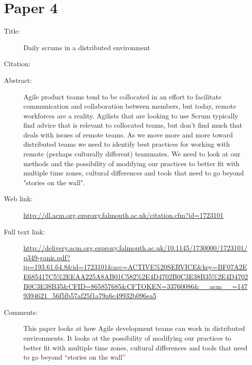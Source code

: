 \documentclass{scrartcl}
\begin{document}
\section*{Paper 4}
\begin{description}
\item[Title:] Daily scrums in a distributed environment
\item[Citation:] \cite{Distributed}
\item[Abstract:] Agile product teams tend to be collocated in an effort to facilitate communication and collaboration between members, but today, remote workforces are a reality. Agilists that are looking to use Scrum typically find advice that is relevant to collocated teams, but don't find much that deals with issues of remote teams. As we move more and more toward distributed teams we need to identify best practices for working with remote (perhaps culturally different) teammates. We need to look at our methods and the possibility of modifying our practices to better fit with multiple time zones, cultural differences and tools that need to go beyond "stories on the wall".
\item[Web link:] \url{http://dl.acm.org.ezproxy.falmouth.ac.uk/citation.cfm?id=1723101}
\item[Full text link:] \url{http://delivery.acm.org.ezproxy.falmouth.ac.uk/10.1145/1730000/1723101/p349-ganis.pdf?ip=193.61.64.8&id=1723101&acc=ACTIVE%20SERVICE&key=BF07A2EE685417C5%2EEAA225A8AB01C582%2E4D4702B0C3E38B35%2E4D4702B0C3E38B35&CFID=865857685&CFTOKEN=33760086&__acm__=1479394621_56f5fb57af25f1a79a6c49932b096ea5}
\item[Comments:] This paper looks at how Agile development teams can work in distributed environments. It looks at the possibility of modifying our practices to better fit with multiple time zones, cultural differences and tools that need to go beyond “stories on the wall”

\end{description}
\end{document}
